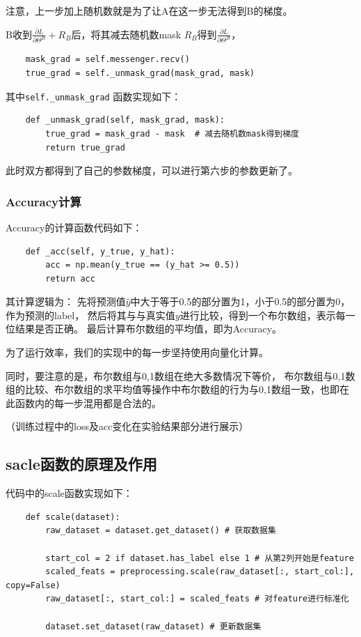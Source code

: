 \documentclass[twoside,11pt]{article}
\begin{document}
注意，上一步加上随机数就是为了让A在这一步无法得到B的梯度。

B收到$\frac{\partial L}{\partial \Theta^B}+R_B$后，将其减去随机数mask $R_B$得到$\frac{\partial L}{\partial \Theta^B}$，
\begin{lstlisting}
    mask_grad = self.messenger.recv()
    true_grad = self._unmask_grad(mask_grad, mask)
\end{lstlisting}

其中\verb |self._unmask_grad| 函数实现如下：
\begin{lstlisting}
    def _unmask_grad(self, mask_grad, mask):
        true_grad = mask_grad - mask  # 减去随机数mask得到梯度
        return true_grad
\end{lstlisting}

此时双方都得到了自己的参数梯度，可以进行第六步的参数更新了。

\subsubsection{Accuracy计算}
Accuracy的计算函数代码如下：
\begin{lstlisting}
    def _acc(self, y_true, y_hat):
        acc = np.mean(y_true == (y_hat >= 0.5))
        return acc
\end{lstlisting}

其计算逻辑为：
先将预测值$\hat{y}$中大于等于0.5的部分置为1，小于0.5的部分置为0，作为预测的label，
然后将其与与真实值$y$进行比较，得到一个布尔数组，表示每一位结果是否正确。
最后计算布尔数组的平均值，即为Accuracy。

为了运行效率，我们的实现中的每一步坚持使用向量化计算。

同时，要注意的是，布尔数组与0,1数组在绝大多数情况下等价，
布尔数组与0,1数组的比较、布尔数组的求平均值等操作中布尔数组的行为与0,1数组一致，也即在此函数内的每一步混用都是合法的。

（训练过程中的loss及acc变化在实验结果部分进行展示）

\subsection{sacle函数的原理及作用}
代码中的scale函数实现如下：
\begin{lstlisting}
    def scale(dataset):
        raw_dataset = dataset.get_dataset() # 获取数据集

        start_col = 2 if dataset.has_label else 1 # 从第2列开始是feature
        scaled_feats = preprocessing.scale(raw_dataset[:, start_col:], copy=False)
        raw_dataset[:, start_col:] = scaled_feats # 对feature进行标准化

        dataset.set_dataset(raw_dataset) # 更新数据集
\end{lstlisting}
\end{document}
